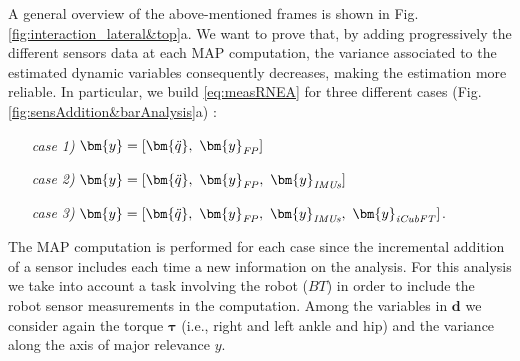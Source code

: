 \indent
A general overview of the above-mentioned frames is shown in Fig.
 \ref{fig:interaction_lateral&top}a. We want to prove that, by adding progressively 
 the different sensors data at each MAP computation, the variance associated to 
 the estimated dynamic variables consequently decreases, making the estimation more reliable.
%
In particular, we build \eqref{eq:measRNEA} for three different cases (Fig.
 \ref{fig:sensAddition&barAnalysis}a) :
\begin{itemize}
\item[\textit{case 1)}]  $\bm{y} = [\bm{\ddot{q}},~\bm{y}_{\mbox{\scriptsize{\emph{FP}}}}]$
\item[\textit{case 2)}] $\bm{y} = [\bm{\ddot{q}},~\bm{y}_{\mbox{\scriptsize{\emph{FP}}}},~ \bm{y}_{\mbox{\scriptsize{\emph{IMUs}}}}]$ 
\item[\textit{case 3)}] $\bm{y} = [\bm{\ddot{q}},~\bm{y}_{\mbox{\scriptsize{\emph{FP}}}},~ \bm{y}_{\mbox{\scriptsize{\emph{IMUs}}}},~\bm{y}_{\mbox{\scriptsize{\emph{iCubFT}}}}]$.
\end{itemize}
%
The MAP computation is performed for each case since the incremental addition of a sensor 
includes each time a new information on the analysis.  
For this analysis we take into account a task involving the robot ($BT$) in order to 
include the robot sensor measurements in the computation.  Among the variables in $\bm d$ we consider again the torque $\bm \tau$ (i.e., right and left ankle and hip) and the variance along the axis of major relevance $y$.

